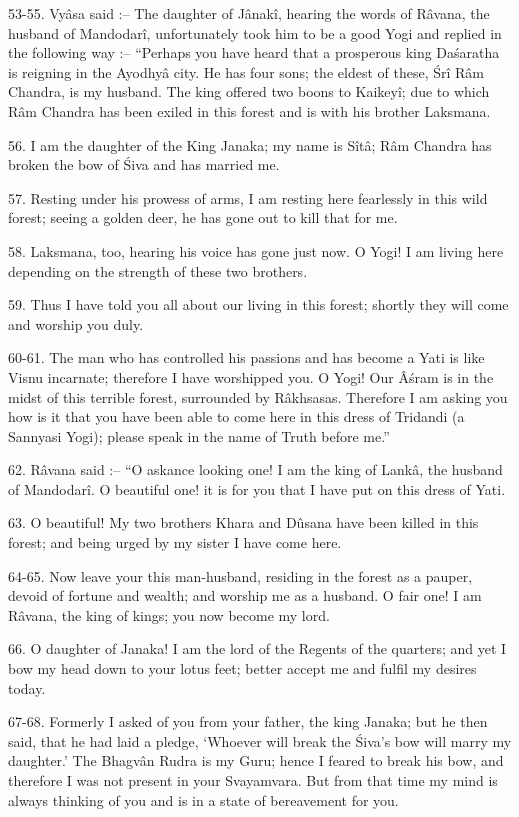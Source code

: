 53-55. Vy\^asa said :-- The daughter of J\^anak\^i, hearing the words of R\^avana, the husband of Mandodar\^i, unfortunately took him to be a good Yogi and replied in the following way :-- ``Perhaps you have heard that a prosperous king Da\'saratha is reigning in the Ayodhy\^a city. He has four sons; the eldest of these, \'Sr\^i R\^am Chandra, is my husband. The king offered two boons to Kaikey\^i; due to which R\^am Chandra has been exiled in this forest and is with his brother Laksmana.

56. I am the daughter of the King Janaka; my name is S\^it\^a; R\^am Chandra has broken the bow of \'Siva and has married me.

57. Resting under his prowess of arms, I am resting here fearlessly in this wild forest; seeing a golden deer, he has gone out to kill that for me.

58. Laksmana, too, hearing his voice has gone just now. O Yogi! I am living here depending on the strength of these two brothers.

59. Thus I have told you all about our living in this forest; shortly they will come and worship you duly.

60-61. The man who has controlled his passions and has become a Yati is like Visnu incarnate; therefore I have worshipped you. O Yogi! Our Â\'sram is in the midst of this terrible forest, surrounded by R\^akhsasas. Therefore I am asking you how is it that you have been able to come here in this dress of Tridandi (a Sannyasi Yogi); please speak in the name of Truth before me.''

62. R\^avana said :-- ``O askance looking one! I am the king of Lank\^a, the husband of Mandodar\^i. O beautiful one! it is for you that I have put on this dress of Yati.

63. O beautiful! My two brothers Khara and Dûsana have been killed in this forest; and being urged by my sister I have come here.

64-65. Now leave your this man-husband, residing in the forest as a pauper, devoid of fortune and wealth; and worship me as a husband. O fair one! I am R\^avana, the king of kings; you now become my lord.

66. O daughter of Janaka! I am the lord of the Regents of the quarters; and yet I bow my head down to your lotus feet; better accept me and fulfil my desires today.

67-68. Formerly I asked of you from your father, the king Janaka; but he then said, that he had laid a pledge, ‘Whoever will break the \'Siva's bow will marry my daughter.' The Bhagv\^an Rudra is my Guru; hence I feared to break his bow, and therefore I was not present in your Svayamvara. But from that time my mind is always thinking of you and is in a state of bereavement for you.


